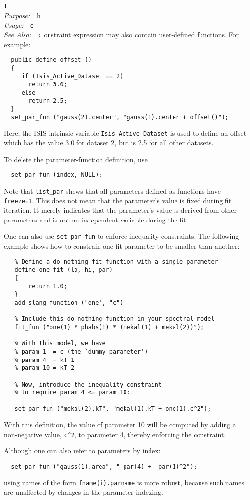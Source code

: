 \documentclass{book}
\makeatletter
\newif\ifpdf
\newenvironment{isisfunction}[4]%
{\index{{#1}@{\tt #1}}%
  \ifpdf
  \else
     \addcontentsline{toc}{subsection}{{#1} -- {#2}}
  \fi
  \vbox{
          \vspace*{\baselineskip}
          {\LARGE\tt #1}\vspace*{\baselineskip}\\
          {{\it Purpose:}~~{#2}}\\
          {{\it Usage:}~~{\tt #3}}\\
          {{\it See Also:}~~{\tt #4}}
       }
}%
{ }
\makeatother
\begin{document}
{\begin{isisfunction}
The constraint expression may also contain user-defined functions.
For example:
\begin{verbatim}
  public define offset ()
  {
     if (Isis_Active_Dataset == 2)
       return 3.0;
     else
       return 2.5;
  }
  set_par_fun ("gauss(2).center", "gauss(1).center + offset()");
\end{verbatim}
Here, the ISIS intrinsic variable \verb|Isis_Active_Dataset| is
used to define an offset which has the value 3.0 for dataset 2,
but is 2.5 for all other datasets.

To delete the parameter-function definition, use
\begin{verbatim}
  set_par_fun (index, NULL);
\end{verbatim}

Note that \verb|list_par| shows that all parameters defined as
functions have \verb|freeze=1|. This does not mean that the
parameter's value is fixed during fit iteration.  It merely
indicates that the parameter's value is derived from other
parameters and is not an independent variable during the fit.

One can also use \verb|set_par_fun| to enforce inequality
constraints.  The following example shows how to constrain one fit
parameter to be smaller than another:

\begin{verbatim}
   % Define a do-nothing fit function with a single parameter
   define one_fit (lo, hi, par)
   {
       return 1.0;
   }
   add_slang_function ("one", "c");

   % Include this do-nothing function in your spectral model
   fit_fun ("one(1) * phabs(1) * (mekal(1) + mekal(2))");

   % With this model, we have
   % param 1  = c (the `dummy parameter')
   % param 4  = kT_1
   % param 10 = kT_2

   % Now, introduce the inequality constraint
   % to require param 4 <= param 10:

   set_par_fun ("mekal(2).kT", "mekal(1).kT + one(1).c^2");
\end{verbatim}

With this definition, the value of parameter 10 will be computed
by adding a non-negative value, \verb|c^2|, to parameter 4, thereby
enforcing the constraint.

Although one can also refer to parameters by index:
\begin{verbatim}
  set_par_fun ("gauss(1).area", "_par(4) + _par(1)^2");
\end{verbatim}
using names of the form \verb|fname(i).parname| is more robust,
because such names are unaffected by changes in the parameter
indexing.


\end{isisfunction}}
\end{document}
